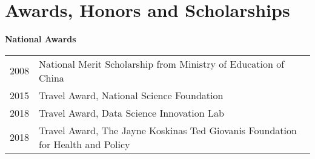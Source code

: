 \documentclass[10pt]{article}
\begin{document}
\begin{enumerate}
\end{enumerate}

%

\section*{Awards, Honors and Scholarships}

\textbf{National Awards}

\begin{table}[H]
\hskip0.9cm\begin{tabular}{p{1.6cm}p{12cm}}
2008 & National Merit Scholarship from Ministry of Education of China  \\
2015 & Travel Award, National Science Foundation \\
2018 & Travel Award, Data Science Innovation Lab \\
2018 & Travel Award, The Jayne Koskinas Ted Giovanis Foundation for Health and Policy
\end{tabular}
\end{table}
\end{document}
